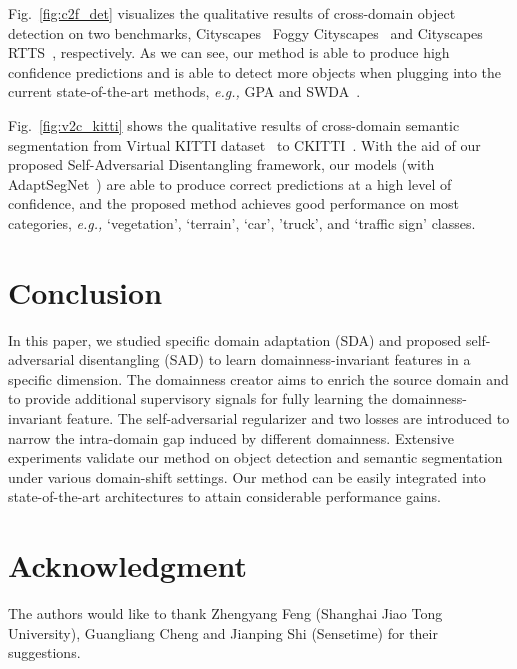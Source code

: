 \documentclass[10pt,journal,compsoc]{IEEEtran}
\begin{document}
Fig.~\ref{fig:c2f_det} visualizes the qualitative results of cross-domain object detection on two benchmarks, Cityscapes~\cite{cordts2016cityscapes}  Foggy Cityscapes~\cite{FoggyCity} and Cityscapes~\cite{cordts2016cityscapes}  RTTS~\cite{RTTS}, respectively. As we can see, our method is able to produce high confidence predictions and is able to detect more objects when plugging into the current state-of-the-art methods, \emph{e.g.,} GPA and SWDA~\cite{SWDA}.

Fig.~\ref{fig:v2c_kitti} shows the qualitative results of cross-domain semantic segmentation from Virtual KITTI dataset~\cite{VKITTI} to CKITTI~\cite{kITTI,cordts2016cityscapes}. With the aid of our proposed Self-Adversarial Disentangling framework,  our models (with AdaptSegNet~\cite{AdaptSegNet}) are able to produce correct predictions at a high level of confidence, and the proposed method achieves good performance on most categories, \emph{e.g.,} ‘vegetation’, ‘terrain’, ‘car’, 'truck', and ‘traffic sign’ classes. 

 

\section{Conclusion}
In this paper, we studied specific domain adaptation (SDA) and proposed self-adversarial disentangling (SAD) to learn domainness-invariant features in a specific dimension. The domainness creator aims to enrich the source domain and to provide additional supervisory signals for fully learning the domainness-invariant feature. The self-adversarial regularizer and two losses are introduced to narrow the intra-domain gap induced by different domainness. Extensive experiments validate our method on object detection and semantic segmentation under various domain-shift settings. Our method can be easily integrated into state-of-the-art architectures to attain considerable performance gains. 



\section*{Acknowledgment}
The authors would like to thank Zhengyang Feng (Shanghai Jiao Tong University), Guangliang Cheng and Jianping Shi (Sensetime) for their suggestions.




\ifCLASSOPTIONcaptionsoff
  \newpage
\fi










\vspace{-1cm}
\end{document}
